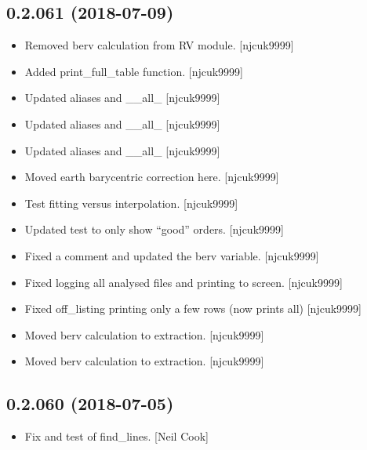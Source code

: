 \documentclass[a4paper,10pt,english]{report}
\begin{document}
\subsection{0.2.061 (2018-07-09)}
\label{\detokenize{misc/changelog:id397}}\begin{itemize}
\item {} 
Removed berv calculation from RV module. {[}njcuk9999{]}

\item {} 
Added print\_full\_table function. {[}njcuk9999{]}

\item {} 
Updated aliases and \_\_all\_ {[}njcuk9999{]}

\item {} 
Updated aliases and \_\_all\_ {[}njcuk9999{]}

\item {} 
Updated aliases and \_\_all\_ {[}njcuk9999{]}

\item {} 
Moved earth barycentric correction here. {[}njcuk9999{]}

\item {} 
Test fitting versus interpolation. {[}njcuk9999{]}

\item {} 
Updated test to only show “good” orders. {[}njcuk9999{]}

\item {} 
Fixed a comment and updated the berv variable. {[}njcuk9999{]}

\item {} 
Fixed logging all analysed files and printing to screen. {[}njcuk9999{]}

\item {} 
Fixed off\_listing printing only a few rows (now prints all)
{[}njcuk9999{]}

\item {} 
Moved berv calculation to extraction. {[}njcuk9999{]}

\item {} 
Moved berv calculation to extraction. {[}njcuk9999{]}

\end{itemize}


\subsection{0.2.060 (2018-07-05)}
\label{\detokenize{misc/changelog:id398}}\begin{itemize}
\item {} 
Fix and test of find\_lines. {[}Neil Cook{]}

\end{itemize}
\end{document}
